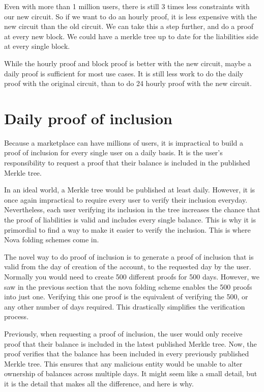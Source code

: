 Even with more than 1 million users, there is still 3 times less constraints with our new circuit.
So if we want to do an hourly proof, it is less expensive with the new circuit than the old circuit.
We can take this a step further, and do a proof at every new block. We could have a merkle tree up to date for the liabilities side at every single block.

While the hourly proof and block proof is better with the new circuit, maybe a daily proof is sufficient for most use cases.
It is still less work to do the daily proof with the original circuit, than to do 24 hourly proof with the new circuit.

\section{Daily proof of inclusion}

Because a marketplace can have millions of users, it is impractical to build a proof of inclusion for every single user on a daily basis.
It is the user's responsibility to request a proof that their balance is included in the published Merkle tree.

In an ideal world, a Merkle tree would be published at least daily. However, it is once again impractical to require every user to verify their inclusion everyday.
Nevertheless, each user verifying its inclusion in the tree increases the chance that the proof of liabilities is valid and includes every single balance.
This is why it is primordial to find a way to make it easier to verify the inclusion. This is where Nova folding schemes come in.

The novel way to do proof of inclusion is to generate a proof of inclusion that is valid from the day of creation of the account, to the requested day by the user.
Normally you would need to create 500 different proofs for 500 days. However, we saw in the previous section that the nova folding scheme enables the 500 proofs into just one.
Verifying this one proof is the equivalent of verifying the 500, or any other number of days required.
This drastically simplifies the verification process.

Previously, when requesting a proof of inclusion, the user would only receive proof that their balance is included in the latest published Merkle tree. Now, the proof verifies that the balance has been included in every previously published Merkle tree.
This ensures that any malicious entity would be unable to alter ownership of balances across multiple days. It might seem like a small detail, but it is the detail that makes all the difference, and here is why.


